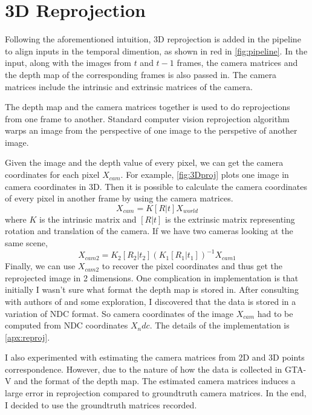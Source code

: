 


\section{3D Reprojection}
Following the aforementioned intuition, 3D reprojection is added in the pipeline to align inputs in the temporal dimention, as shown in red in \ref{fig:pipeline}. In the input, along with the images from $t$ and $t-1$ frames, the camera matrices and the depth map of the corresponding frames is also passed in. The camera matrices include the intrinsic and extrinsic matrices of the camera.

The depth map and the camera matrices together is used to do reprojections from one frame to another. Standard computer vision reprojection algorithm warps an image from the perspective of one image to the perspetive of another image.

Given the image and the depth value of every pixel, we can get the camera coordinates for each pixel $X_{cam}$. For example, \ref{fig:3Dproj} plots one image in camera coordinates in 3D. Then it is possible to calculate the camera coordinates of every pixel in another frame by using the camera matrices. $$ X_{cam} = K[R|t]X_{world} $$ where $K$ is the intrinsic matrix and $[R|t]$ is the extrinsic matrix representing rotation and translation of the camera. If we have two cameras looking at the same scene, $$X_{cam2} = K_2[R_2|t_2](K_1[R_1|t_1])^{-1}X_{cam1}$$ Finally, we can use $X_{cam2}$ to recover the pixel coordinates and thus get the reprojected image in 2 dimensions. One complication in implementation is that initially I wasn't sure what format the depth map is stored in. After consulting with authors of \cite{hu2019sail} and some exploration, I discovered that the data is stored in a variation of NDC format. So camera coordinates of the image $X_{cam}$ had to be computed from NDC coordinates $X_ndc$. The details of the implementation is \ref{apx:reproj}. 

I also experimented with estimating the camera matrices from 2D and 3D points correspondence. However, due to the nature of how the data is collected in GTA-V and the format of the depth map. The estimated camera matrices induces a large error in reprojection compared to groundtruth camera matrices. In the end, I decided to use the groundtruth matrices recorded. 

